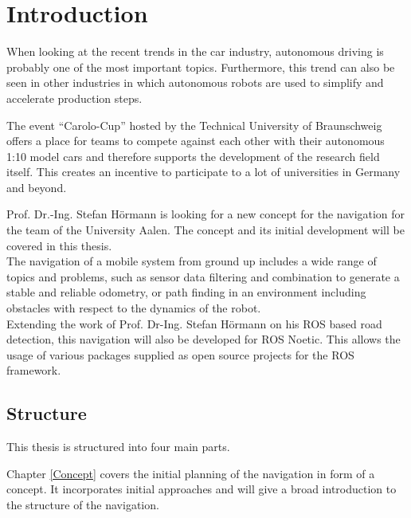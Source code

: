 \chapter{Introduction}
\label{introduction}

When looking at the recent trends in the car industry, autonomous driving is probably one of the most important topics. Furthermore, this trend can also be seen in other industries  in which autonomous robots are used to simplify and accelerate production steps. 



The event ``Carolo-Cup'' hosted by the Technical University of Braunschweig offers a place for teams to compete against each other with their autonomous 1:10 model cars and therefore supports the development of the research field itself. This creates an incentive to participate to a lot of universities in Germany and beyond.\\

Prof. Dr.-Ing. Stefan Hörmann is looking for a new concept for the navigation for the team of the University Aalen. The concept and its initial development will be covered in this thesis.\\
The navigation of a mobile system from ground up includes a wide range of topics and problems, such as sensor data filtering and combination to generate a stable and reliable odometry, or path finding in an environment including obstacles with respect to the dynamics of the robot.\\

Extending the work of Prof. Dr-Ing. Stefan Hörmann on his ROS based road detection, this navigation will also be developed for ROS Noetic. This allows the usage of various packages supplied as open source projects for the ROS framework.

\section{Structure}

This thesis is structured into four main parts.

Chapter \ref{Concept} covers the initial planning of the navigation in form of a concept. It incorporates initial approaches and will give a broad introduction to the structure of the navigation.\\

